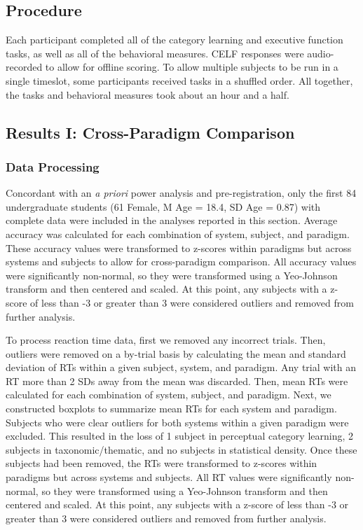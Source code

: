 \documentclass[../dissertation.tex]{subfiles}
\begin{document}
\subsection{Procedure}

Each participant completed all of the category learning and executive function tasks, as well as all of the behavioral measures. CELF responses were audio-recorded to allow for offline scoring. To allow multiple subjects to be run in a single timeslot, some participants received tasks in a shuffled order. All together, the tasks and behavioral measures took about an hour and a half.

\subsection{Results I: Cross-Paradigm Comparison}

\subsubsection{Data Processing}
Concordant with an \textit{a priori} power analysis and pre-registration, only the first 84 undergraduate students (61 Female, M Age = 18.4, SD Age = 0.87) with complete data were included in the analyses reported in this section. Average accuracy was calculated for each combination of system, subject, and paradigm. These accuracy values were transformed to z-scores within paradigms but across systems and subjects to allow for cross-paradigm comparison. All accuracy values were significantly non-normal, so they were transformed using a Yeo-Johnson transform and then centered and scaled. At this point, any subjects with a z-score of less than -3 or greater than 3 were considered outliers and removed from further analysis. \par
	To process reaction time data, first we removed any incorrect trials. Then, outliers were removed on a by-trial basis by calculating the mean and standard deviation of RTs within a given subject, system, and paradigm. Any trial with an RT more than 2 SDs away from the mean was discarded. Then, mean RTs were calculated for each combination of system, subject, and paradigm. Next, we constructed boxplots to summarize mean RTs for each system and paradigm. Subjects who were clear outliers for both systems within a given paradigm were excluded. This resulted in the loss of 1 subject in perceptual category learning, 2 subjects in taxonomic/thematic, and no subjects in statistical density. Once these subjects had been removed, the RTs were transformed to z-scores within paradigms but across systems and subjects. All RT values were significantly non-normal, so they were transformed using a Yeo-Johnson transform and then centered and scaled. At this point, any subjects with a z-score of less than -3 or greater than 3 were considered outliers and removed from further analysis. \par
\end{document}
